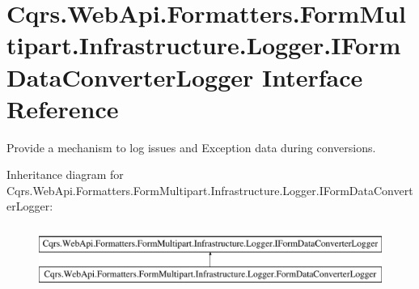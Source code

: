 \hypertarget{interfaceCqrs_1_1WebApi_1_1Formatters_1_1FormMultipart_1_1Infrastructure_1_1Logger_1_1IFormDataConverterLogger}{}\section{Cqrs.\+Web\+Api.\+Formatters.\+Form\+Multipart.\+Infrastructure.\+Logger.\+I\+Form\+Data\+Converter\+Logger Interface Reference}
\label{interfaceCqrs_1_1WebApi_1_1Formatters_1_1FormMultipart_1_1Infrastructure_1_1Logger_1_1IFormDataConverterLogger}


Provide a mechanism to log issues and Exception data during conversions.  


Inheritance diagram for Cqrs.\+Web\+Api.\+Formatters.\+Form\+Multipart.\+Infrastructure.\+Logger.\+I\+Form\+Data\+Converter\+Logger\+:\begin{figure}[H]
\begin{center}
\leavevmode
\includegraphics[height=2.000000cm]{interfaceCqrs_1_1WebApi_1_1Formatters_1_1FormMultipart_1_1Infrastructure_1_1Logger_1_1IFormDataConverterLogger}
\end{center}
\end{figure}
